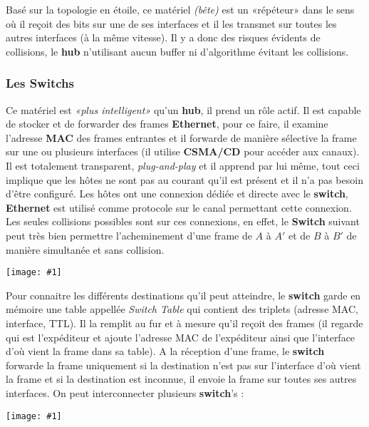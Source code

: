 \documentclass{article}
\newcommand{\imgR}[2]{\begin{center}\texttt{[image: \#1]}\end{center}}
\begin{document}
Basé sur la topologie en étoile, ce matériel \textit{(bête)} est un «répéteur» dans le sens où il reçoit des bits
sur une de ses interfaces et il les transmet sur toutes les autres interfaces (à la même vitesse). Il y a donc 
des risques évidents de collisions, le \textbf{hub} n'utilisant aucun buffer ni d'algorithme évitant les 
collisions.

\subsubsection{Les Switchs}

Ce matériel est \textit{«plus intelligent»} qu'un \textbf{hub}, il prend un rôle actif. Il est capable de stocker
et de forwarder des frames \textbf{Ethernet}, pour ce faire, il examine l'adresse \textbf{MAC} des frames 
entrantes et il forwarde de manière sélective la frame sur une ou plusieurs interfaces (il utilise 
\textbf{CSMA/CD} pour accéder aux canaux). Il est totalement transparent, \textit{plug-and-play} et il apprend 
par lui même, tout ceci implique que les hôtes ne sont pas au courant qu'il est présent et il n'a pas besoin 
d'être configuré. Les hôtes ont une connexion dédiée et directe avec le \textbf{switch}, \textbf{Ethernet} est 
utilisé comme protocole sur le canal permettant cette connexion. Les seules collisions possibles sont sur ces 
connexions, en effet, le \textbf{Switch} suivant peut très bien permettre l'acheminement d'une frame de $A$ à 
$A'$ et de $B$ à $B'$ de manière simultanée et sans collision.

\imgR{CN_124.png}{100}

Pour connaitre les différents destinations qu'il peut atteindre, le \textbf{switch} garde en mémoire une table 
appellée \textit{Switch Table} qui contient des triplets (adresse MAC, interface, TTL). Il la remplit au fur et à 
mesure qu'il reçoit des frames (il regarde qui est l'expéditeur et ajoute l'adresse MAC de l'expéditeur ainsi que
l'interface d'où vient la frame dans sa table). A la réception d'une frame, le \textbf{switch} forwarde la frame
uniquement si la destination n'est pas sur l'interface d'où vient la frame et si la destination est inconnue, il
envoie la frame sur toutes ses autres interfaces. On peut interconnecter plusieurs \textbf{switch}'s :

\imgR{CN_125.png}{250}
\end{document}
